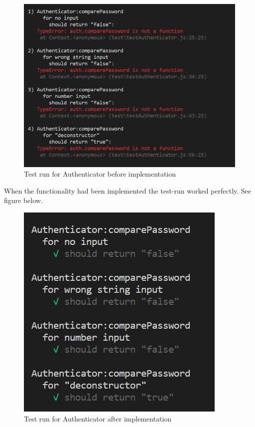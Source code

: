 \documentclass[12pt, letterpaper]{article}
\begin{document}
\begin{figure}[H]\label{fig1}
	\centering
	\includegraphics{authtest1.png}
	\caption{Test run for Authenticator before implementation}
\end{figure}
When the functionality had been implemented the test-run worked perfectly. See figure below.
\begin{figure}[H]\label{fig2}
	\centering
	\includegraphics{authtest2.png}
	\caption{Test run for Authenticator after implementation}
\end{figure}
\end{document}
